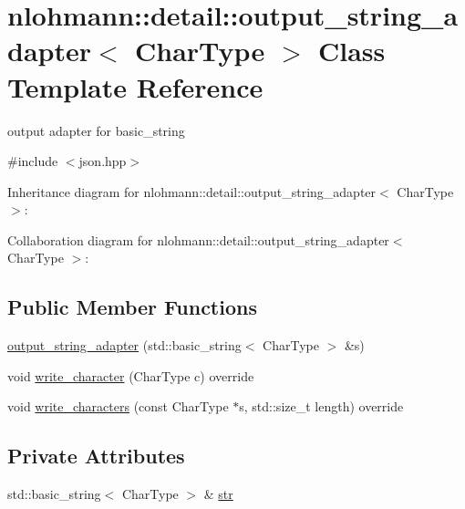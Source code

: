\hypertarget{classnlohmann_1_1detail_1_1output__string__adapter}{}\section{nlohmann\+:\+:detail\+:\+:output\+\_\+string\+\_\+adapter$<$ Char\+Type $>$ Class Template Reference}
\label{classnlohmann_1_1detail_1_1output__string__adapter}


output adapter for basic\+\_\+string  




{\ttfamily \#include $<$json.\+hpp$>$}



Inheritance diagram for nlohmann\+:\+:detail\+:\+:output\+\_\+string\+\_\+adapter$<$ Char\+Type $>$\+:


Collaboration diagram for nlohmann\+:\+:detail\+:\+:output\+\_\+string\+\_\+adapter$<$ Char\+Type $>$\+:
\subsection*{Public Member Functions}
\begin{DoxyCompactItemize}
\item 
\hyperlink{classnlohmann_1_1detail_1_1output__string__adapter_a2086c9bd140c2ef28775fe190684fd68}{output\+\_\+string\+\_\+adapter} (std\+::basic\+\_\+string$<$ Char\+Type $>$ \&s)
\item 
void \hyperlink{classnlohmann_1_1detail_1_1output__string__adapter_ae66b8b2b776acd4fc20bcb24dc7a4fac}{write\+\_\+character} (Char\+Type c) override
\item 
void \hyperlink{classnlohmann_1_1detail_1_1output__string__adapter_ad356f6e878ee105e72e66d18b665f623}{write\+\_\+characters} (const Char\+Type $\ast$s, std\+::size\+\_\+t length) override
\end{DoxyCompactItemize}
\subsection*{Private Attributes}
\begin{DoxyCompactItemize}
\item 
std\+::basic\+\_\+string$<$ Char\+Type $>$ \& \hyperlink{classnlohmann_1_1detail_1_1output__string__adapter_afdf2c531466e6111b13d7a913bcf2507}{str}
\end{DoxyCompactItemize}



